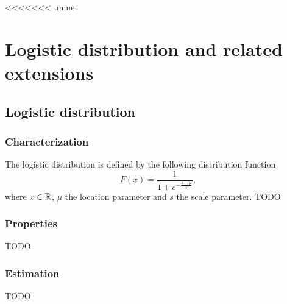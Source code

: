 <<<<<<< .mine
% 	
%
%
%

\chapter{Logistic distribution and related extensions}
\section{Logistic distribution}
\subsection{Characterization}
The logistic distribution is defined by the following distribution function
$$
F(x) = \frac{1}{1+e^{-\frac{x-\mu}{s}}},
$$
where $x\in\mathbb R$, $\mu$ the location parameter and $s$ the scale parameter.
TODO
\subsection{Properties}
TODO
\subsection{Estimation}
TODO
